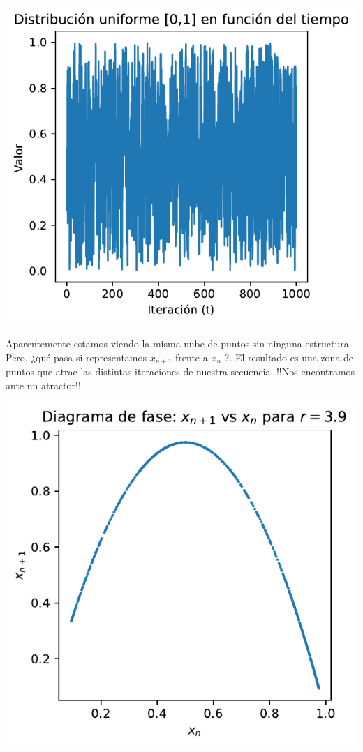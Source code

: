 \documentclass[
  10pt,
  a4paper,
  DIV=11,
  numbers=noendperiod,
  open=any]{scrreprt}
\makeatletter
\newcommand*\pandocbounded[1]{%
  \sbox\pandoc@box{#1}%
  \Gscale@div\@tempa{\textheight}{\dimexpr\ht\pandoc@box+\dp\pandoc@box\relax}%
  \Gscale@div\@tempb{\linewidth}{\wd\pandoc@box}%
  \ifdim\@tempb\p@<\@tempa\p@\let\@tempa\@tempb\fi%
  \ifdim\@tempa\p@<\p@\scalebox{\@tempa}{\usebox\pandoc@box}%
  \else\usebox{\pandoc@box}%
  \fi%
}
\numberwithin{equation}{chapter}
\numberwithin{equation}{section}
\renewcommand{\[}{\begin{equation}}
\renewcommand{\]}{\end{equation}}
\providecommand{\pandocbounded}[1]{#1}%
\renewcommand{\pandocbounded}[1]{\begingroup\centering #1\par\endgroup}
\makeatother
\begin{document}
\pandocbounded{\includegraphics[keepaspectratio]{04-clima/atractor_files/figure-pdf/cell-3-output-1.pdf}}

Aparentemente estamos viendo la misma nube de puntos sin ninguna
estructura. Pero, ¿qué pasa si representamos \(x_{n+1}\) frente a
\(x_n\) ?. El resultado es una zona de puntos que atrae las distintas
iteraciones de nuestra secuencia. !!Nos encontramos ante un atractor!!

\pandocbounded{\includegraphics[keepaspectratio]{04-clima/atractor_files/figure-pdf/cell-4-output-1.pdf}}
\end{document}
